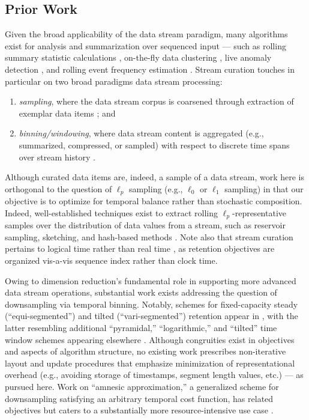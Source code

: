 \subsection{Prior Work}
\label{sec:prior-work}

Given the broad applicability of the data stream paradigm, many algorithms exist for analysis and summarization over sequenced input --- such as rolling summary statistic calculations \citep{lin2004continuously}, on-the-fly data clustering \citep{silva2013data}, live anomaly detection \citep{cai2004maids}, and rolling event frequency estimation \citep{manku2002approximate}.
Stream curation touches in particular on two broad paradigms data stream processing:
\begin{enumerate}
\item \textit{sampling}, where the data stream corpus is coarsened through extraction of exemplar data items \citep{sibai2016sampling}; and
\item \textit{binning/windowing}, where data stream content is aggregated (e.g., summarized, compressed, or sampled) with respect to discrete time spans over stream history \citep{gama2007data}.
\end{enumerate}

Although curated data items are, indeed, a sample of a data stream, work here is orthogonal to the question of $\ell_p$ sampling (e.g., $\ell_0$ or $\ell_1$ sampling) in that our objective is to optimize for temporal balance rather than stochastic composition.
Indeed, well-established techniques exist to extract rolling $\ell_p$-representative samples over the distribution of data values from a stream, such as reservoir sampling, sketching, and hash-based methods \citep{gaber2005mining,muthukrishnan2005data,cormode2019lp}.
Note also that stream curation pertains to logical time rather than real time \citep{sibai2016sampling}, as retention objectives are organized vis-a-vis sequence index rather than clock time.

Owing to dimension reduction's fundamental role in supporting more advanced data stream operations, substantial work exists addressing the question of downsampling via temporal binning.
Notably, schemes for fixed-capacity steady (``equi-segmented'') and tilted (``vari-segmented'') retention appear in \citep{zhao2005generalized}, with the latter resembling additional ``pyramidal,'' ``logarithmic,'' and ``tilted'' time window schemes appearing elsewhere \citep{aggarwal2003framework,han2005stream,giannella2003mining,phithakkitnukoon2010recent}.
Although congruities exist in objectives and aspects of algorithm structure, no existing work prescribes non-iterative layout and update procedures that emphasize minimization of representational overhead (e.g., avoiding storage of timestamps, segment length values, etc.) --- as pursued here.
Work on ``amnesic approximation,'' a generalized scheme for downsampling satisfying an arbitrary temporal cost function, has related objectives but caters to a substantially more resource-intensive use case \citep{palpanas2004online}.

